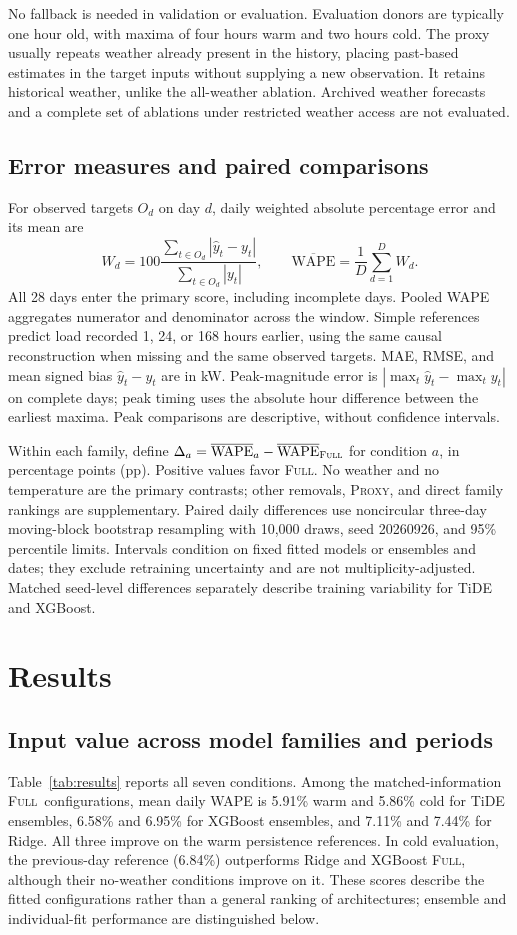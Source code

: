 \documentclass[conference]{IEEEtran}
\newcommand{\full}{\textsc{Full}}
\newcommand{\proxy}{\textsc{Proxy}}
\newcommand{\mdw}{\overline{\mathrm{WAPE}}}
\begin{document}
No fallback is needed in validation or evaluation. Evaluation donors are typically one hour old, with maxima of four hours warm and two hours cold. The proxy usually repeats weather already present in the history, placing past-based estimates in the target inputs without supplying a new observation. It retains historical weather, unlike the all-weather ablation. Archived weather forecasts and a complete set of ablations under restricted weather access are not evaluated.

\subsection{Error measures and paired comparisons}
For observed targets $O_d$ on day $d$, daily weighted absolute percentage error and its mean are
\begin{equation}
W_d=100\frac{\sum_{t\in O_d}|\hat y_t-y_t|}{\sum_{t\in O_d}|y_t|},
\qquad \mdw=\frac{1}{D}\sum_{d=1}^{D}W_d.
\label{eq:wape}
\end{equation}
All 28 days enter the primary score, including incomplete days. Pooled WAPE aggregates numerator and denominator across the window. Simple references predict load recorded 1, 24, or 168 hours earlier, using the same causal reconstruction when missing and the same observed targets. MAE, RMSE, and mean signed bias $\hat y_t-y_t$ are in kW. Peak-magnitude error is $|\max_t\hat y_t-\max_t y_t|$ on complete days; peak timing uses the absolute hour difference between the earliest maxima. Peak comparisons are descriptive, without confidence intervals.

Within each family, define $\Delta_a=\mdw_a-\mdw_{\full}$ for condition $a$, in percentage points (pp). Positive values favor \full. No weather and no temperature are the primary contrasts; other removals, \proxy, and direct family rankings are supplementary. Paired daily differences use noncircular three-day moving-block bootstrap resampling with 10,000 draws, seed 20260926, and 95\% percentile limits. Intervals condition on fixed fitted models or ensembles and dates; they exclude retraining uncertainty and are not multiplicity-adjusted. Matched seed-level differences separately describe training variability for TiDE and XGBoost.

\section{Results}
\subsection{Input value across model families and periods}
Table~\ref{tab:results} reports all seven conditions. Among the matched-information \full\ configurations, mean daily WAPE is 5.91\% warm and 5.86\% cold for TiDE ensembles, 6.58\% and 6.95\% for XGBoost ensembles, and 7.11\% and 7.44\% for Ridge. All three improve on the warm persistence references. In cold evaluation, the previous-day reference (6.84\%) outperforms Ridge and XGBoost \full, although their no-weather conditions improve on it. These scores describe the fitted configurations rather than a general ranking of architectures; ensemble and individual-fit performance are distinguished below.
\end{document}
